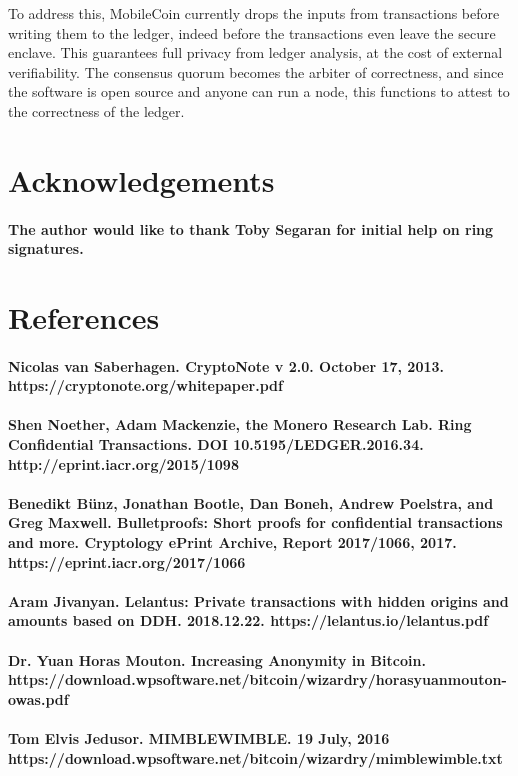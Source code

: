 \documentclass{article}
\begin{document}
To address this, MobileCoin currently drops the inputs from transactions before writing them to the ledger, indeed before the transactions even leave the secure enclave.  This guarantees full privacy from ledger analysis, at the cost of external verifiability.  The consensus quorum becomes the arbiter of correctness, and since the software is open source and anyone can run a node, this functions to attest to the correctness of the ledger.



\section{Acknowledgements}

\paragraph{The author would like to thank Toby Segaran for initial help on ring signatures.}



\section{References}

\paragraph{Nicolas van Saberhagen. CryptoNote v 2.0. October 17, 2013. https://cryptonote.org/whitepaper.pdf}

\paragraph{Shen Noether, Adam Mackenzie, the Monero Research Lab. Ring Confidential Transactions. DOI 10.5195/LEDGER.2016.34. http://eprint.iacr.org/2015/1098}

\paragraph{Benedikt Bünz, Jonathan Bootle, Dan Boneh, Andrew Poelstra, and Greg Maxwell. Bulletproofs: Short proofs for confidential transactions and more. Cryptology ePrint Archive, Report 2017/1066, 2017. https://eprint.iacr.org/2017/1066}

\paragraph{Aram Jivanyan. Lelantus: Private transactions with hidden origins and amounts based on DDH. 2018.12.22. https://lelantus.io/lelantus.pdf}

\paragraph{Dr. Yuan Horas Mouton. Increasing Anonymity in Bitcoin. https://download.wpsoftware.net/bitcoin/wizardry/horasyuanmouton-owas.pdf}

\paragraph{Tom Elvis Jedusor. MIMBLEWIMBLE. 19 July, 2016 https://download.wpsoftware.net/bitcoin/wizardry/mimblewimble.txt}
\end{document}

